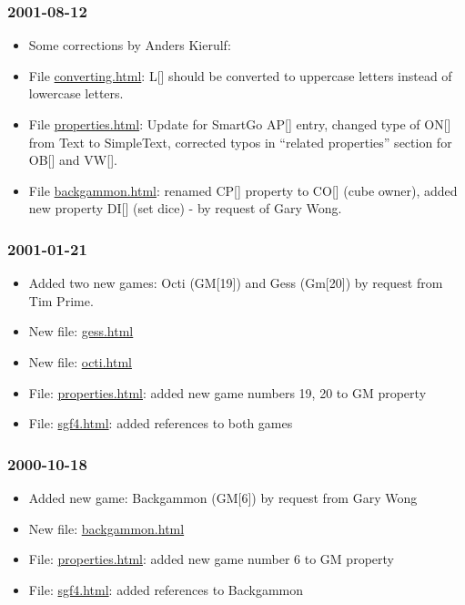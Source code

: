 \subsubsection{2001-08-12}\label{section-6}

\begin{itemize}
\item
  Some corrections by Anders Kierulf:
\item
  File \href{https://red-bean.com/sgf/converting.html}{converting.html}:
  L{[}{]} should be converted to uppercase letters instead of lowercase
  letters.
\item
  File \href{https://red-bean.com/sgf/properties.html}{properties.html}:
  Update for SmartGo AP{[}{]} entry, changed type of ON{[}{]} from Text
  to SimpleText, corrected typos in ``related properties'' section for
  OB{[}{]} and VW{[}{]}.
\item
  File \href{https://red-bean.com/sgf/backgammon.html}{backgammon.html}:
  renamed CP{[}{]} property to CO{[}{]} (cube owner), added new property
  DI{[}{]} (set dice) - by request of Gary Wong.
\end{itemize}

\subsubsection{2001-01-21}\label{section-7}

\begin{itemize}
\item
  Added two new games: Octi (GM{[}19{]}) and Gess (Gm{[}20{]}) by
  request from Tim Prime.
\item
  New file: \href{https://red-bean.com/sgf/gess.html}{gess.html}
\item
  New file: \href{https://red-bean.com/sgf/octi.html}{octi.html}
\item
  File:
  \href{https://red-bean.com/sgf/properties.html}{properties.html}:
  added new game numbers 19, 20 to GM property
\item
  File: \href{https://red-bean.com/sgf/sgf4.html}{sgf4.html}: added
  references to both games
\end{itemize}

\subsubsection{2000-10-18}\label{section-8}

\begin{itemize}
\item
  Added new game: Backgammon (GM{[}6{]}) by request from Gary Wong
\item
  New file:
  \href{https://red-bean.com/sgf/backgammon.html}{backgammon.html}
\item
  File:
  \href{https://red-bean.com/sgf/properties.html}{properties.html}:
  added new game number 6 to GM property
\item
  File: \href{https://red-bean.com/sgf/sgf4.html}{sgf4.html}: added
  references to Backgammon
\end{itemize}

